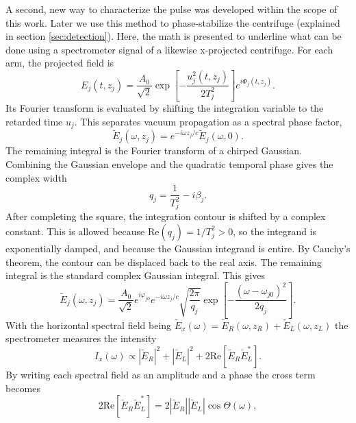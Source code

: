 A second, new way to characterize the pulse was developed within the scope of this work. Later we use this method to phase-stabilize the centrifuge (explained in section \ref{sec:detection}). Here, the math is presented to underline what can be done using a spectrometer signal of a likewise x-projected centrifuge. For each arm, the projected field is
\begin{equation}
    E_j(t,z_j) = \frac{A_0}{\sqrt{2}} \exp\left[ -\frac{u_j^2(t,z_j)}{2T_j^2} \right] e^{i\Phi_j(t,z_j)}.
    \label{eq:projected_field}
\end{equation}
Its Fourier transform is evaluated by shifting the integration variable to the retarded time $u_j$. This separates vacuum propagation as a spectral phase factor,
\begin{equation}
    \tilde E_j(\omega,z_j) = e^{-i\omega z_j/c}\tilde E_j(\omega,0).
    \label{eq:propagation_phase}
\end{equation}
The remaining integral is the Fourier transform of a chirped Gaussian. Combining the Gaussian envelope and the quadratic temporal phase gives the complex width
\begin{equation}
    q_j=\frac{1}{T_j^2}-i\beta_j.
    \label{eq:complex_width}
\end{equation}
After completing the square, the integration contour is shifted by a complex constant. This is allowed because $\mathrm{Re}(q_j)=1/T_j^2>0$, so the integrand is exponentially damped, and because the Gaussian integrand is entire. By Cauchy's theorem, the contour can be displaced back to the real axis. The remaining integral is the standard complex Gaussian integral. This gives
\begin{equation}
    \tilde E_j(\omega,z_j) = \frac{A_0}{\sqrt{2}} e^{i\varphi_{j0}} e^{-i\omega z_j/c} \sqrt{\frac{2\pi}{q_j}} \exp\left[ -\frac{(\omega-\omega_{j0})^2}{2q_j} \right].
    \label{eq:spectral_field}
\end{equation}
With the horizontal spectral field being $\tilde E_x(\omega)=\tilde E_R(\omega,z_R)+\tilde E_L(\omega,z_L)$ the spectrometer measures the intensity
\begin{equation}
    I_x(\omega) \propto |\tilde E_R|^2 + |\tilde E_L|^2 + 2\mathrm{Re} \left[ \tilde E_R\tilde E_L^* \right].
    \label{eq:spectrometer_intensity}
\end{equation}
By writing each spectral field as an amplitude and a phase the cross term becomes
\begin{equation}
    2\mathrm{Re} \left[ \tilde E_R\tilde E_L^* \right] = 2|\tilde E_R||\tilde E_L| \cos\Theta(\omega),
    \label{eq:cross_term_spectral}
\end{equation}
